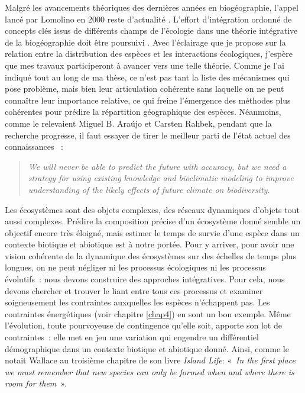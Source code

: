 Malgré les avancements théoriques des dernières années en biogéographie,
l'appel lancé par Lomolino en 2000 reste d'actualité
\citep{Lomolino2000}. L'effort d'intégration ordonné de concepts clés
issus de différents champs de l'écologie dans une théorie intégrative de
la biogéographie doit être poursuivi \citep{Thuiller2013}. Avec
l'éclairage que je propose sur la relation entre la distribution des
espèces et les interactions écologiques, j'espère que mes travaux
participeront à avancer vers une telle théorie. Comme je l'ai indiqué
tout au long de ma thèse, ce n'est pas tant la liste des mécanismes qui
pose problème, mais bien leur articulation cohérente sans laquelle on ne
peut connaître leur importance relative, ce qui freine l'émergence des
méthodes plus cohérentes pour prédire la répartition géographique des
espèces. Néanmoins, comme le relevaient Miguel B. Araújo et Carsten
Rahbek, pendant que la recherche progresse, il faut essayer de tirer le
meilleur parti de l'état actuel des connaissances \citep{Araujo2006}~:

\begin{quote}
\emph{We will never be able to predict the future with accuracy, but we
need a strategy for using existing knowledge and bioclimatic modeling to
improve understanding of the likely effects of future climate on
biodiversity.}
\end{quote}

Les écosystèmes sont des objets complexes, des réseaux dynamiques
d'objets tout aussi complexes. Prédire la composition précise d'un
écosystème donné semble un objectif encore très éloigné, mais estimer le
temps de survie d'une espèce dans un contexte biotique et abiotique est
à notre portée. Pour y arriver, pour avoir une vision cohérente de la
dynamique des écosystèmes sur des échelles de temps plus longues, on ne
peut négliger ni les processus écologiques ni les processus évolutifs~:
nous devons construire des approches intégratives. Pour cela, nous
devons chercher et trouver le liant entre tous ces processus et examiner
soigneusement les contraintes auxquelles les espèces n'échappent pas.
Les contraintes énergétiques (voir chapitre \ref{chap4}) en sont un bon
exemple. Même l'évolution, toute pourvoyeuse de contingence qu'elle
soit, apporte son lot de contraintes~: elle met en jeu une variation qui
engendre un différentiel démographique dans un contexte biotique et
abiotique donné. Ainsi, comme le notait Wallace au troisième chapitre de
son livre \emph{Island Life}: «~\emph{In the first place we must
remember that new species can only be formed when and where there is
room for them}~».
